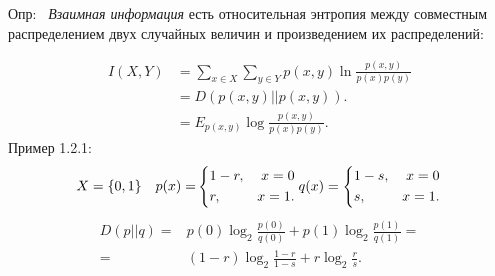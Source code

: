 \documentclass[12pt,a4paper]{scrartcl}
\begin{document}
	Опр:  \ {\itshape Взаимная информация\/} есть относительная энтропия между совместным распределением двух случайных величин и произведением их распределений:
	
	\begin{equation}
	\begin{split}
		I(X, Y) & = \sum_{x \in X}^{} \sum_{y \in Y}^{} p(x, y) \ln{\frac{p(x, y)}{p(x)p(y)}} \\
				& = D(p(x, y) || p(x, y)). \\
				& = E_{p(x, y)} \log{\frac{p(x, y)}{p(x)p(y)}}.
	\end{split}
	\end{equation}
	Пример 1.2.1: \\
	\[
	\begin{aligned}
	X = \{ 0, 1 \} & & p(x) = 
	\end{aligned}
	\left\{
	\begin{aligned}
	& 1 - r, & x = 0\\
	& r, & x = 1.
	\end{aligned}
	\right.
	q(x) = \left\{
	\begin{aligned}
	& 1 - s, & x = 0\\
	& s, & x = 1.
	\end{aligned}
	\right.\\
	\]
	\[
	\begin{split}
	D(p || q ) = & p(0)\log_{2}\frac{p(0)}{q(0)} + p(1)\log_{2}\frac{p(1)}{q(1)} = \\
				= & (1-r)\log_{2}\frac{1-r}{1-s} + r\log_{2}\frac{r}{s}.
	\end{split}
	\]
\end{document}
